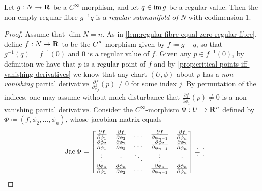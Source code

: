 \begin{lemma}
    \label{lem:regular-fibres-are-embedded-manifolds}
    Let \(g: N \to \mathbf{R}\) be a \(C^{\infty}\)-morphism, and let \(q \in \operatorname{im} g\) be a
    regular value. Then the non-empty regular fibre \(g^{-1} q\) is a \emph{regular
        submanifold of \(N\)} with codimension \(1\).
\end{lemma}

\begin{proof}
    Assume that \(\dim N = n\). As in
    \cref{lem:regular-fibre-equal-zero-regular-fibre}, define \(f: N \to \mathbf{R}\) to be
    the \(C^{\infty}\)-morphism given by \(f \coloneq g - q\), so that
    \(g^{-1}(q) = f^{-1}(0)\) and \(0\) is a regular value of \(f\). Given any
    \(p \in f^{-1}(0)\), by definition we have that \(p\) is a regular point of
    \(f\) and by \cref{prop:critical-points-iff-vanishing-derivatives} we know that
    any chart \((U, \phi)\) about \(p\) has a \emph{non-vanishing} partial
    derivative \(\frac{\partial f}{\partial \phi_j}(p) \neq 0\) for some index
    \(j\). By permutation of the indices, one may assume without much disturbance
    that \(\frac{\partial f}{\partial \phi_1}(p) \neq 0\) is a non-vanishing partial
    derivative. Consider the \(C^{\infty}\)-morphism \(\Phi: U \to \mathbf{R}^n\) defined by
    \(\Phi \coloneq (f, \phi_2, \dots, \phi_n)\), whose jacobian matrix equals
    \[
        \operatorname{Jac} \Phi =
        \begin{bmatrix}
            \frac{\partial f}{\partial \phi_1}
                   & \frac{\partial f}{\partial \phi_2}
                   & \dots
                   & \frac{\partial f}{\partial \phi_{n-1}}
                   & \frac{\partial f}{\partial \phi_n}
            \\
            \frac{\partial \phi_2}{\partial \phi_1}
                   & \frac{\partial \phi_2}{\partial \phi_2}
                   & \dots
                   & \frac{\partial \phi_2}{\partial \phi_{n-1}}
                   & \frac{\partial \phi_2}{\partial \phi_n}
            \\
            \vdots & \vdots                                      & \ddots & \vdots & \vdots
            \\
            \frac{\partial \phi_n}{\partial \phi_1}
                   & \frac{\partial \phi_n}{\partial \phi_2}
                   & \dots
                   & \frac{\partial \phi_n}{\partial \phi_{n-1}}
                   & \frac{\partial \phi_n}{\partial \phi_n}
        \end{bmatrix}
        =
        \begin{bmatrix}

\end{bmatrix}\]
\end{proof}
